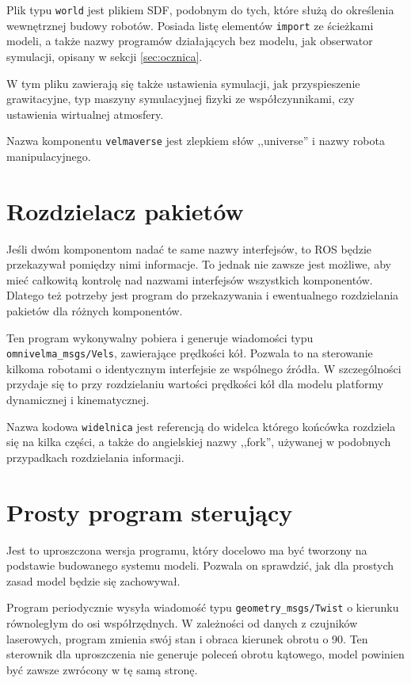 	Plik typu \texttt{world} jest plikiem SDF, podobnym do tych, które służą do określenia wewnętrznej budowy robotów.
	Posiada listę elementów \texttt{import} ze ścieżkami modeli, a także nazwy programów działających bez modelu, jak obserwator symulacji, opisany w sekcji \ref{sec:ocznica}.

	W tym pliku zawierają się także ustawienia symulacji, jak przyspieszenie grawitacyjne, typ maszyny symulacyjnej fizyki ze współczynnikami, czy ustawienia wirtualnej atmosfery.
	
	Nazwa komponentu \texttt{velmaverse} jest zlepkiem słów ,,universe'' i nazwy robota manipulacyjnego.
	
\section{Rozdzielacz pakietów}
	Jeśli dwóm komponentom nadać te same nazwy interfejsów, to ROS będzie przekazywał pomiędzy nimi informacje.
	To jednak nie zawsze jest możliwe, aby mieć całkowitą kontrolę nad nazwami interfejsów wszystkich komponentów.
	Dlatego też potrzeby jest program do przekazywania i ewentualnego rozdzielania pakietów dla różnych komponentów.
	
	Ten program wykonywalny pobiera i generuje wiadomości typu \texttt{omnivelma\_msgs/Vels}, zawierające prędkości kół.
	Pozwala to na sterowanie kilkoma robotami o identycznym interfejsie ze wspólnego źródła.
	W szczególności przydaje się to przy rozdzielaniu wartości prędkości kół dla modelu platformy dynamicznej i kinematycznej.
	
	Nazwa kodowa \texttt{widelnica} jest referencją do widelca którego końcówka rozdziela się na kilka części, a także do angielskiej nazwy ,,fork'', używanej w podobnych 
	przypadkach rozdzielania informacji.
	
\section{Prosty program sterujący}
	Jest to uproszczona wersja programu, który docelowo ma być tworzony na podstawie budowanego systemu modeli.
	Pozwala on sprawdzić, jak dla prostych zasad model będzie się zachowywał.
	
	Program periodycznie wysyła wiadomość typu \texttt{geometry\_msgs/Twist} o kierunku równoległym do osi współrzędnych.
	W zależności od danych z czujników laserowych, program zmienia swój stan i obraca kierunek obrotu o 90\textdegree.
	Ten sterownik dla uproszczenia nie generuje poleceń obrotu kątowego, model powinien być zawsze zwrócony w tę samą stronę.
	
